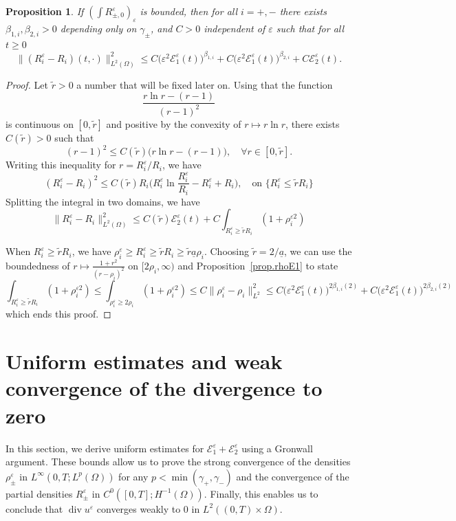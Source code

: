 \documentclass[11pt, twoside, a4paper]{article}
\theoremstyle{plain}
\newtheorem{proposition}[theorem]{Proposition}
\theoremstyle{remark}
\numberwithin{equation}{section}
\def\EE{{\mathcal E}}
\renewcommand{\div}{\operatorname{div}}
\renewcommand{\leq}{\leqslant}\renewcommand{\le}{\leqslant}
\renewcommand{\geq}{\geqslant}\renewcommand{\ge}{\geqslant}
\newcommand{\eps}{\varepsilon}
\begin{document}
\begin{proposition}\label{prop.estRL2}
 If $(\int R_{\pm,0}^\eps)_\eps$ is bounded, then for all $i=+,-$ there exists $\beta_{1,i}, \beta_{2,i}>0$ depending only on $\gamma_\pm$, and $C>0$ independent of $\eps$ such that for all $t\geq 0$
 \[
 \| (R_i^\eps - R_i)(t,\cdot) \|_{L^2(\Omega)}^2 \leq C \Big(\eps^{2} \EE_1^\eps(t) \Big)^{\beta_{1,i}}+C\Big(\eps^{2} \EE_1^\eps(t) \Big)^{\beta_{2,i}} + C \EE_2^\eps (t).
 \]
\end{proposition}
\begin{proof}
Let $\tilde r>0$ a number that will be fixed later on. Using that the function
\[
\frac{r\ln r -(r-1)}{(r-1)^2}
\]
is continuous on $[0,\tilde r]$ and positive by the convexity of $r\mapsto r\ln r$, there exists $C(\tilde r)>0$ such that
\[
(r-1)^2 \leq C(\tilde r)\Big( r\ln r -(r-1)\Big) , \quad \forall r\in [0,\tilde r].
\]
Writing this inequality for $r=R_i^\eps/R_i$, we have
\[
(R_i^\eps-R_i)^2 \leq C(\tilde r)R_i \Big( R_i^\eps\ln \frac{R_i^\eps}{R_i} -R_i^\eps+R_i\Big) , \quad \text{on } \{ R_i^\eps \leq \tilde r R_i \}
\]
Splitting the integral in two domains, we have
\[
\| R_i^\eps -R_i \|_{L^2(\Omega)}^2 \leq C(\tilde r)\EE_2^\eps(t) + C\int_{R_i^\eps \geq \tilde r R_i } (1 + \rho_i^{\eps 2} )
\]

When $R_i^\eps \geq \tilde r R_i$, we have $\rho_i^\eps \geq R_i^\eps \geq \tilde r R_i\geq \tilde r \underline{a} \rho_i$. Choosing $\tilde r =2/\underline{a}$, we can use the boundedness of $r\mapsto \frac{1+r^2}{(r-\rho_i)^2}$ on $[2\rho_i,\infty)$ and Proposition~\ref{prop.rhoE1} to state
\[
\int_{R_i^\eps \geq \tilde r R_i } (1 + \rho_i^{\eps 2} ) \leq \int_{\rho_i^\eps \geq 2 \rho_i } (1 + \rho_i^{\eps 2} ) \leq C \| \rho_i^\eps -\rho_i\|_{L^2}^2 \leq C \Big(\eps^{2} \EE_1^\eps(t) \Big)^{2\beta_{1,i}(2)}+C\Big(\eps^{2} \EE_1^\eps(t) \Big)^{2\beta_{2,i}(2)}
\]
which ends this proof.
\end{proof}








\section{Uniform estimates and weak convergence of the divergence to zero}\label{convR}


In this section, we derive uniform estimates for $\EE_1^\varepsilon + \EE_2^\varepsilon$ using a Gronwall argument. These bounds allow us to prove the strong convergence of the densities $\rho_\pm^\eps$ in $L^\infty(0,T;L^p(\Omega))$ for any $p<\min (\gamma_+,\gamma_-)$ and the convergence of the partial densities $R_\pm^\varepsilon$ in $C^0([0,T];H^{-1}(\Omega))$. Finally, this enables us to conclude that $\div u^\eps$ converges weakly to 0 in $L^2((0,T)\times \Omega)$.
\end{document}
